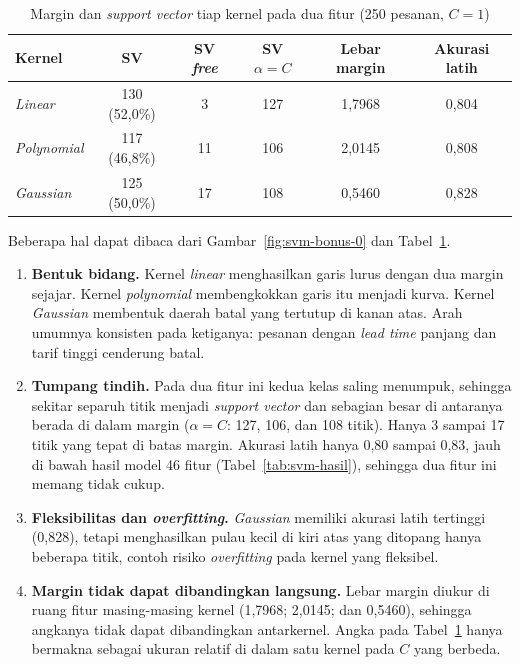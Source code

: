 \begin{table}[H]
	\centering
	\caption{Margin dan \textit{support vector} tiap kernel pada dua fitur (250 pesanan, $C = 1$)}
	\label{tab:svm-bidang}
	\small
	\begin{tabular}{l c c c c c}
		\toprule
		\textbf{Kernel} & \textbf{SV} & \textbf{SV \textit{free}} & \textbf{SV $\alpha = C$} & \textbf{Lebar margin} & \textbf{Akurasi latih} \\
		\midrule
		\textit{Linear} & 130 (52,0\%) & 3 & 127 & 1,7968 & 0,804 \\
		\textit{Polynomial} & 117 (46,8\%) & 11 & 106 & 2,0145 & 0,808 \\
		\textit{Gaussian} & 125 (50,0\%) & 17 & 108 & 0,5460 & 0,828 \\
		\bottomrule
	\end{tabular}
\end{table}

Beberapa hal dapat dibaca dari Gambar~\ref{fig:svm-bonus-0} dan Tabel~\ref{tab:svm-bidang}.
\begin{enumerate}
	\item \textbf{Bentuk bidang.} Kernel \textit{linear} menghasilkan garis lurus dengan dua margin sejajar. Kernel \textit{polynomial} membengkokkan garis itu menjadi kurva. Kernel \textit{Gaussian} membentuk daerah batal yang tertutup di kanan atas. Arah umumnya konsisten pada ketiganya: pesanan dengan \textit{lead time} panjang dan tarif tinggi cenderung batal.
	\item \textbf{Tumpang tindih.} Pada dua fitur ini kedua kelas saling menumpuk, sehingga sekitar separuh titik menjadi \textit{support vector} dan sebagian besar di antaranya berada di dalam margin ($\alpha = C$: 127, 106, dan 108 titik). Hanya 3 sampai 17 titik yang tepat di batas margin. Akurasi latih hanya 0,80 sampai 0,83, jauh di bawah hasil model 46 fitur (Tabel~\ref{tab:svm-hasil}), sehingga dua fitur ini memang tidak cukup.
	\item \textbf{Fleksibilitas dan \textit{overfitting}.} \textit{Gaussian} memiliki akurasi latih tertinggi (0,828), tetapi menghasilkan pulau kecil di kiri atas yang ditopang hanya beberapa titik, contoh risiko \textit{overfitting} pada kernel yang fleksibel.
	\item \textbf{Margin tidak dapat dibandingkan langsung.} Lebar margin diukur di ruang fitur masing-masing kernel (1,7968; 2,0145; dan 0,5460), sehingga angkanya tidak dapat dibandingkan antarkernel. Angka pada Tabel~\ref{tab:svm-bidang} hanya bermakna sebagai ukuran relatif di dalam satu kernel pada $C$ yang berbeda.
\end{enumerate}

